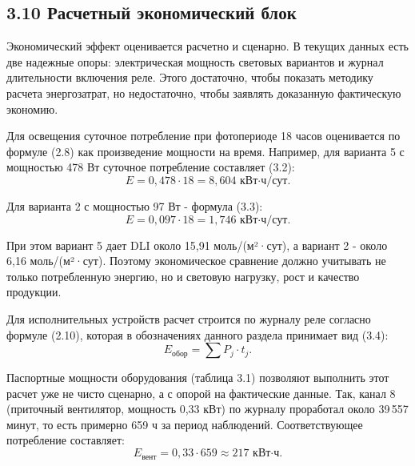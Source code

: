 \documentclass[a4paper,14pt]{extarticle}
\begin{document}
\hypertarget{ux440ux430ux441ux447ux435ux442ux43dux44bux439-ux44dux43aux43eux43dux43eux43cux438ux447ux435ux441ux43aux438ux439-ux431ux43bux43eux43a}{%
\subsection{3.10 Расчетный экономический
блок}\label{ux440ux430ux441ux447ux435ux442ux43dux44bux439-ux44dux43aux43eux43dux43eux43cux438ux447ux435ux441ux43aux438ux439-ux431ux43bux43eux43a}}

Экономический эффект оценивается расчетно и сценарно. В текущих данных
есть две надежные опоры: электрическая мощность световых вариантов и
журнал длительности включения реле. Этого достаточно, чтобы показать
методику расчета энергозатрат, но недостаточно, чтобы заявлять
доказанную фактическую экономию.

Для освещения суточное потребление при фотопериоде 18 часов оценивается
по формуле (2.8) как произведение мощности на время. Например, для
варианта 5 с мощностью 478 Вт суточное потребление составляет (3.2):
\begin{equation}
E = 0{,}478 \cdot 18 = 8{,}604 \text{ кВт·ч/сут}.
\tag{3.2}
\end{equation}

Для варианта 2 с мощностью 97 Вт - формула (3.3):
\begin{equation}
E = 0{,}097 \cdot 18 = 1{,}746 \text{ кВт·ч/сут}.
\tag{3.3}
\end{equation}

При этом вариант 5 дает DLI около 15,91 моль/(м²·сут), а вариант 2 -
около 6,16 моль/(м²·сут). Поэтому экономическое сравнение должно
учитывать не только потребленную энергию, но и световую нагрузку, рост и
качество продукции.

Для исполнительных устройств расчет строится по журналу реле согласно
формуле (2.10), которая в обозначениях данного раздела принимает вид
(3.4):
\begin{equation}
E_{\text{обор}} = \sum P_j \cdot t_j.
\tag{3.4}
\end{equation}

Паспортные мощности оборудования (таблица 3.1) позволяют выполнить этот
расчет уже не чисто сценарно, а с опорой на фактические данные. Так,
канал 8 (приточный вентилятор, мощность 0,33 кВт) по журналу проработал
около 39\,557 минут, то есть примерно 659 ч за период наблюдений.
Соответствующее потребление составляет:
\begin{equation}
E_{\text{вент}} = 0{,}33 \cdot 659 \approx 217 \text{ кВт·ч}.
\tag{3.5}
\end{equation}
\end{document}
